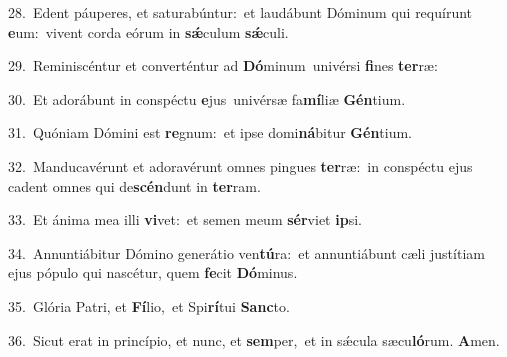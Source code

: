 {\numbfont\textcolor{\numbcolor}{28.}}~Edent páuperes, et saturabúntur:~\dagger et laudábunt Dóminum qui requírunt \textbf{e}\-um:~\star vivent corda eórum in \textbf{sǽ}\-culum \textbf{sǽ}\-culi.\par
{\numbfont\textcolor{\numbcolor}{29.}}~Reminiscéntur et converténtur ad \textbf{Dó}\-minum~\star univérsi \textbf{fi}\-nes \textbf{ter}\-ræ:\par
{\numbfont\textcolor{\numbcolor}{30.}}~Et adorábunt in conspéctu \textbf{e}\-jus~\star univérsæ fa\-\textbf{mí}\-liæ \textbf{Gén}\-tium.\par
{\numbfont\textcolor{\numbcolor}{31.}}~Quóniam Dómini est \textbf{re}\-gnum:~\star et ipse domi\-\textbf{ná}\-bitur \textbf{Gén}\-tium.\par
{\numbfont\textcolor{\numbcolor}{32.}}~Manducavérunt et adoravérunt omnes pingues \textbf{ter}\-ræ:~\star in conspéctu ejus cadent omnes qui de\-\textbf{scén}\-dunt in \textbf{ter}\-ram.\par
{\numbfont\textcolor{\numbcolor}{33.}}~Et ánima mea illi \textbf{vi}\-vet:~\star et semen meum \textbf{sér}\-viet \textbf{ip}\-si.\par
{\numbfont\textcolor{\numbcolor}{34.}}~Annuntiábitur Dómino generátio ven\-\textbf{tú}\-ra:~\star et annuntiábunt cæli justítiam ejus pópulo qui nascétur, quem \textbf{fe}\-cit \textbf{Dó}\-minus.\par
{\numbfont\textcolor{\numbcolor}{35.}}~Glória Patri, et \textbf{Fí}\-lio,~\star et Spi\-\textbf{rí}\-tui \textbf{Sanc}\-to.\par
{\numbfont\textcolor{\numbcolor}{36.}}~Sicut erat in princípio, et nunc, et \textbf{sem}\-per,~\star et in sǽcula sæcu\-\textbf{ló}\-rum. \textbf{A}\-men.\par
